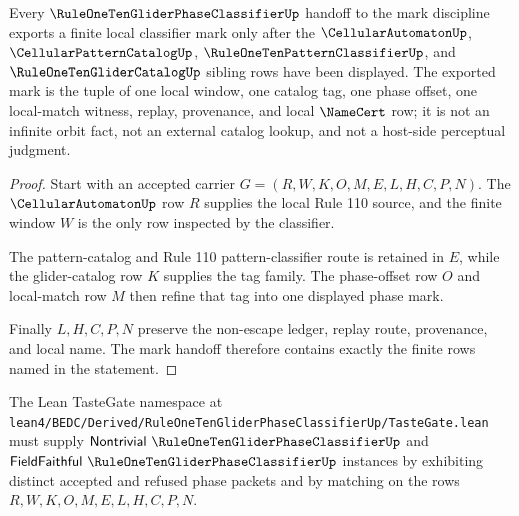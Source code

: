 \begin{theorem}
\label{thm:rule110-glider-phase-classifier-mark-handoff}
Every $\RuleOneTenGliderPhaseClassifierUp$ handoff to the mark discipline exports a finite local classifier mark only after the $\CellularAutomatonUp$, $\CellularPatternCatalogUp$, $\RuleOneTenPatternClassifierUp$, and $\RuleOneTenGliderCatalogUp$ sibling rows have been displayed. The exported mark is the tuple of one local window, one catalog tag, one phase offset, one local-match witness, replay, provenance, and local $\NameCert$ row; it is not an infinite orbit fact, not an external catalog lookup, and not a host-side perceptual judgment.
\end{theorem}
\begin{proof}
Start with an accepted carrier $G=(R,W,K,O,M,E,L,H,C,P,N)$. The $\CellularAutomatonUp$ row $R$ supplies the local Rule 110 source, and the finite window $W$ is the only row inspected by the classifier.

The pattern-catalog and Rule 110 pattern-classifier route is retained in $E$, while the glider-catalog row $K$ supplies the tag family. The phase-offset row $O$ and local-match row $M$ then refine that tag into one displayed phase mark.

Finally $L,H,C,P,N$ preserve the non-escape ledger, replay route, provenance, and local name. The mark handoff therefore contains exactly the finite rows named in the statement.
\end{proof}

The Lean TasteGate namespace at \texttt{lean4/BEDC/Derived/RuleOneTenGliderPhaseClassifierUp/TasteGate.lean} must supply $\mathsf{Nontrivial}\ \RuleOneTenGliderPhaseClassifierUp$ and $\mathsf{FieldFaithful}\ \RuleOneTenGliderPhaseClassifierUp$ instances by exhibiting distinct accepted and refused phase packets and by matching on the rows $R,W,K,O,M,E,L,H,C,P,N$.



